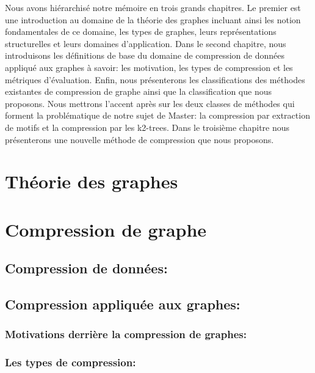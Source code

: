 \documentclass[a4paper,oneside,12pt]{report}
\theoremstyle{definition}
\begin{document}
			
			 Nous avons hiérarchisé notre mémoire en trois grands chapitres. Le premier est une introduction au domaine de la théorie des graphes incluant ainsi les notion fondamentales de ce domaine, les types de graphes, leurs représentations structurelles et leurs domaines d'application. Dans le second chapitre, nous introduisons les définitions de base du domaine de compression de données appliqué aux graphes à savoir: les motivation, les types de compression et les métriques d'évaluation. Enfin, nous présenterons les classifications des méthodes existantes de compression de graphe ainsi que la classification que nous proposons. Nous mettrons l'accent après sur les deux classes de méthodes qui forment la problématique de notre sujet de Master: la compression par extraction de motifs et la compression par les k2-trees. Dans le troisième chapitre nous présenterons une nouvelle méthode de compression que nous proposons.
	



	\chapter{ Théorie des graphes}
	  
	

	\chapter{Compression de graphe}
		
		\section{Compression de données: }
			
		
		\section{Compression appliquée aux graphes:}
	
			\subsection{Motivations derrière la compression de graphes: }
	
			\subsection{Les types de compression:}
			
			
\end{document}
